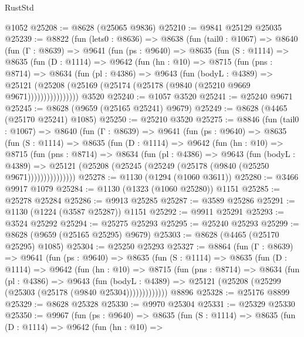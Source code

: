 \begin{lexlean}{RustStd}
\begin{coremodule}
    @1052
@25208 := @8628 (@25065 @9836)
@25210 := @9841 @25129 @25035
@25239 := @8822
    (fun (lets0 : @8636) =>
    @8638
      (fun (tail0 : @1067) =>
      @8640
        (fun (Γ : @8639) =>
        @9641
          (fun (ps : @9640) =>
          @8635
            (fun (S : @1114) =>
            @8635
              (fun (D : @1114) =>
              @9642
                (fun (hn : @10) =>
                @8715
                  (fun (pns : @8714) =>
                  @8634
                    (fun (pl : @4386) =>
                    @9643
                      (fun (bodyL : @4389) =>
                      @25121
                        (@25208 (@25169 (@25174 (@25178 (@9840 (@25210 @9669 @9671))))))))))))))))
    @3520
@25240 := @1057 @3520
@25241 := @25240 @9671
@25245 := @8628 (@9659 (@25165 @25241) @9679)
@25249 := @8628 (@4465 (@25170 @25241) @1085)
@25250 := @25210 @3520
@25275 := @8846
    (fun (tail0 : @1067) =>
    @8640
      (fun (Γ : @8639) =>
      @9641
        (fun (ps : @9640) =>
        @8635
          (fun (S : @1114) =>
          @8635
            (fun (D : @1114) =>
            @9642
              (fun (hn : @10) =>
              @8715
                (fun (pns : @8714) =>
                @8634
                  (fun (pl : @4386) =>
                  @9643
                    (fun (bodyL : @4389) =>
                    @25121 (@25208 (@25245 (@25249 (@25178 (@9840 (@25250 @9671)))))))))))))))
@25278 := @1130 (@1294 (@1060 @3611))
@25280 := @3466 @9917 @1079
@25284 := @1130 (@1323 (@1060 @25280)) @1151
@25285 := @25278 @25284
@25286 := @9913 @25285
@25287 := @3589 @25286
@25291 := @1130 (@1224 (@3587 @25287)) @1151
@25292 := @9911 @25291
@25293 := @3524 @25292
@25294 := @25275 @25293
@25295 := @25240 @25293
@25299 := @8628 (@9659 (@25165 @25295) @9679)
@25303 := @8628 (@4465 (@25170 @25295) @1085)
@25304 := @25250 @25293
@25327 := @8864
    (fun (Γ : @8639) =>
    @9641
      (fun (ps : @9640) =>
      @8635
        (fun (S : @1114) =>
        @8635
          (fun (D : @1114) =>
          @9642
            (fun (hn : @10) =>
            @8715
              (fun (pns : @8714) =>
              @8634
                (fun (pl : @4386) =>
                @9643
                  (fun (bodyL : @4389) =>
                  @25121 (@25208 (@25299 (@25303 (@25178 (@9840 @25304)))))))))))))
    @8896
@25328 := @25176 @8899
@25329 := @8628 @25328
@25330 := @9970 @25304
@25331 := @25329 @25330
@25350 := @9967
    (fun (ps : @9640) =>
    @8635
      (fun (S : @1114) =>
      @8635
        (fun (D : @1114) =>
        @9642
          (fun (hn : @10) =>

\end{coremodule}
\end{lexlean}
